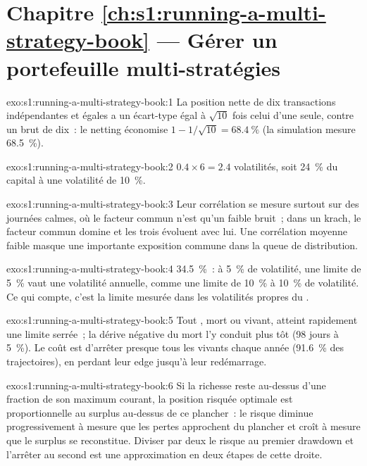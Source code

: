 \section*{Chapitre \ref{ch:s1:running-a-multi-strategy-book} --- Gérer un portefeuille multi-stratégies}

\begin{solution}{exo:s1:running-a-multi-strategy-book:1}
La position nette de dix transactions indépendantes et égales a un écart-type égal à $\sqrt{10}$ fois celui d'une seule, contre un brut de dix~: le netting économise $1 - 1/\sqrt{10} = 68.4~\%$
(la simulation mesure 68.5~\%).
\end{solution}

\begin{solution}{exo:s1:running-a-multi-strategy-book:2}
$0.4 \times 6 = 2.4$ volatilités, soit 24~\% du capital à une volatilité de 10~\%.
\end{solution}

\begin{solution}{exo:s1:running-a-multi-strategy-book:3}
Leur corrélation se mesure surtout sur des journées calmes, où le facteur commun n'est qu'un faible bruit~; dans un krach, le facteur commun domine et les trois évoluent
avec lui. Une corrélation moyenne faible masque une importante exposition commune dans la queue de distribution.
\end{solution}

\begin{solution}{exo:s1:running-a-multi-strategy-book:4}
34.5~\%~: à 5~\% de volatilité, une limite de 5~\% vaut une volatilité annuelle, comme une limite de 10~\% à 10~\% de volatilité. Ce qui compte, c'est la limite mesurée dans les
volatilités propres du .
\end{solution}

\begin{solution}{exo:s1:running-a-multi-strategy-book:5}
Tout , mort ou vivant, atteint rapidement une limite serrée~; la dérive négative du  mort l'y conduit plus tôt (98 jours à 5~\%). Le coût est d'arrêter presque tous les  vivants
chaque année (91.6~\% des trajectoires), en perdant leur edge jusqu'à leur redémarrage.
\end{solution}

\begin{solution}{exo:s1:running-a-multi-strategy-book:6}
Si la richesse reste au-dessus d'une fraction de son maximum courant, la position risquée optimale est proportionnelle au surplus au-dessus de ce plancher~: le risque
diminue progressivement à mesure que les pertes approchent du plancher et croît à mesure que le surplus se reconstitue. Diviser par deux le risque au premier drawdown et l'arrêter au second est une approximation en deux
étapes de cette droite.
\end{solution}

